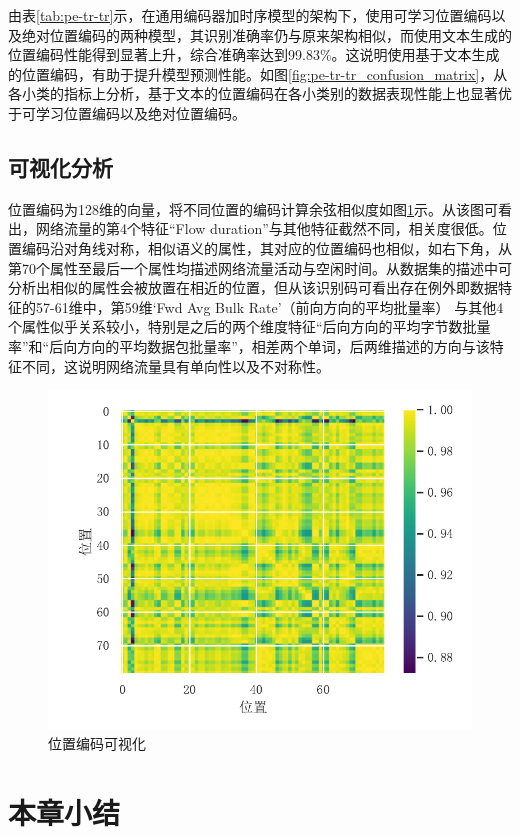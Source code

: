 由表\ref{tab:pe-tr-tr}示，在通用编码器加时序模型的架构下，使用可学习位置编码以及绝对位置编码的两种模型，其识别准确率仍与原来架构相似，而使用文本生成的位置编码性能得到显著上升，综合准确率达到99.83\%。这说明使用基于文本生成的位置编码，有助于提升模型预测性能。如图\ref{fig:pe-tr-tr_confusion_matrix}，从各小类的指标上分析，基于文本的位置编码在各小类别的数据表现性能上也显著优于可学习位置编码以及绝对位置编码。

\subsection{可视化分析}
位置编码为128维的向量，将不同位置的编码计算余弦相似度如图\ref{fig:pe_vis}示。从该图可看出，网络流量的第4个特征“Flow duration”与其他特征截然不同，相关度很低。位置编码沿对角线对称，相似语义的属性，其对应的位置编码也相似，如右下角，从第70个属性至最后一个属性均描述网络流量活动与空闲时间。从数据集的描述中可分析出相似的属性会被放置在相近的位置，但从该识别码可看出存在例外即数据特征的57-61维中，第59维‘Fwd Avg Bulk Rate’（前向方向的平均批量率） 与其他4个属性似乎关系较小，特别是之后的两个维度特征“后向方向的平均字节数批量率”和“后向方向的平均数据包批量率”，相差两个单词，后两维描述的方向与该特征不同，这说明网络流量具有单向性以及不对称性。

\begin{figure}[htbp]
    \centering
    \includegraphics[width=0.75\linewidth]{img/multimodal/none-tr-tr-positional_encoding.pdf}
    \caption{位置编码可视化}
    \label{fig:pe_vis}
\end{figure}

\section{本章小结}

